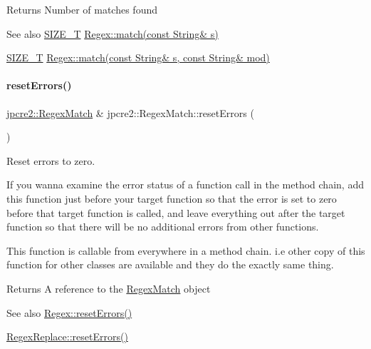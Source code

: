 \begin{DoxyReturn}{Returns}
Number of matches found 
\end{DoxyReturn}
\begin{DoxySeeAlso}{See also}
\hyperlink{namespacejpcre2_a2aac465ddcb123560c7c8215dd69246c}{S\+I\+Z\+E\+\_\+T} \hyperlink{classjpcre2_1_1Regex_a9ffbb6aa54cb97125f1b4211bc1d09a5_a9ffbb6aa54cb97125f1b4211bc1d09a5}{Regex\+::match(const String\& s)} 

\hyperlink{namespacejpcre2_a2aac465ddcb123560c7c8215dd69246c}{S\+I\+Z\+E\+\_\+T} \hyperlink{classjpcre2_1_1Regex_ab93775a93a0a537d09b9e9ab4a5a3894_ab93775a93a0a537d09b9e9ab4a5a3894}{Regex\+::match(const String\& s, const String\& mod)} 
\end{DoxySeeAlso}
\hypertarget{classjpcre2_1_1RegexMatch_aa19512638f2f5389384d6b9ad01c70c0_aa19512638f2f5389384d6b9ad01c70c0}{}\label{classjpcre2_1_1RegexMatch_aa19512638f2f5389384d6b9ad01c70c0_aa19512638f2f5389384d6b9ad01c70c0} 
\paragraph{\texorpdfstring{reset\+Errors()}{resetErrors()}}
{\footnotesize\ttfamily \hyperlink{classjpcre2_1_1RegexMatch}{jpcre2\+::\+Regex\+Match} \& jpcre2\+::\+Regex\+Match\+::reset\+Errors (\begin{DoxyParamCaption}{ }\end{DoxyParamCaption})}



Reset errors to zero. 

If you wanna examine the error status of a function call in the method chain, add this function just before your target function so that the error is set to zero before that target function is called, and leave everything out after the target function so that there will be no additional errors from other functions.

This function is callable from everywhere in a method chain. i.\+e other copy of this function for other classes are available and they do the exactly same thing. \begin{DoxyReturn}{Returns}
A reference to the \hyperlink{classjpcre2_1_1RegexMatch}{Regex\+Match} object 
\end{DoxyReturn}
\begin{DoxySeeAlso}{See also}
\hyperlink{classjpcre2_1_1Regex_aff12a6e75ecd3e623875d12df49b3b89_aff12a6e75ecd3e623875d12df49b3b89}{Regex\+::reset\+Errors()} 

\hyperlink{classjpcre2_1_1RegexReplace_a1d708fe8f948d260a8e033cff7898f9c_a1d708fe8f948d260a8e033cff7898f9c}{Regex\+Replace\+::reset\+Errors()} 
\end{DoxySeeAlso}
\hypertarget{classjpcre2_1_1RegexMatch_ae586d43ec197c57c66086eeb4f8d83a1_ae586d43ec197c57c66086eeb4f8d83a1}{}\label{classjpcre2_1_1RegexMatch_ae586d43ec197c57c66086eeb4f8d83a1_ae586d43ec197c57c66086eeb4f8d83a1} 
